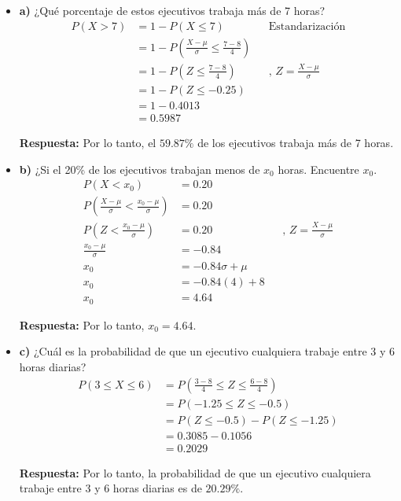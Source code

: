 \documentclass{templateNote}
\begin{document}
\begin{itemize}
  \item \textbf{a)} ¿Qué porcentaje de estos ejecutivos trabaja más de 7 horas?
  \begin{align*}
    P(X > 7) &= 1 - P(X \leq 7) && \text{Estandarización}\\
    &= 1 - P\left(\frac{X - \mu}{\sigma} \leq \frac{7 - 8}{4}\right) \\
    &= 1 - P\left(Z \leq \frac{7 - 8}{4}\right) && \text{, } Z = \frac{X - \mu}{\sigma} \\
    &= 1 - P(Z \leq -0.25) \\
    &= 1 - 0.4013 \\
    &= 0.5987
  \end{align*}

  \textbf{Respuesta:} Por lo tanto, el $59.87\%$ de los ejecutivos trabaja más de 7 horas.
  
  \item \textbf{b)}	¿Si el 20\% de los ejecutivos trabajan menos de $x_0$ horas. Encuentre $x_0$.
  \begin{align*}
    P(X < x_0) &= 0.20 \\
    P\left(\frac{X - \mu}{\sigma} < \frac{x_0 - \mu}{\sigma}\right) &= 0.20 \\
    P\left(Z < \frac{x_0 - \mu}{\sigma}\right) &= 0.20 && \text{, } Z = \frac{X - \mu}{\sigma} \\
    \frac{x_0 - \mu}{\sigma} &= -0.84 \\
    x_0 &= -0.84\sigma + \mu \\
    x_0 &= -0.84(4) + 8 \\
    x_0 &= 4.64
  \end{align*}

  \textbf{Respuesta:} Por lo tanto, $x_0 = 4.64$.
  
  \newpage
  \item \textbf{c)} ¿Cuál es la probabilidad de que un ejecutivo cualquiera trabaje entre 3 y 6 horas diarias?
  \begin{align*}
    P(3 \leq X \leq 6) &= P\left(\frac{3 - 8}{4} \leq Z \leq \frac{6 - 8}{4}\right) \\
    &= P(-1.25 \leq Z \leq -0.5) \\
    &= P(Z \leq -0.5) - P(Z \leq -1.25) \\
    &= 0.3085 - 0.1056 \\
    &= 0.2029
  \end{align*}
  
  \textbf{Respuesta:} Por lo tanto, la probabilidad de que un ejecutivo cualquiera trabaje entre 3 y 6 horas diarias es de $20.29\%$.


\end{itemize}
\end{document}
